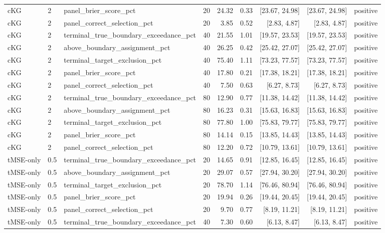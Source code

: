 \begin{longtable}{lllrrrrrl}
cKG & 2 & panel\_brier\_score\_pct & 20 & 24.32 & 0.33 & [23.67, 24.98] & [23.67, 24.98] & positive \\
cKG & 2 & panel\_correct\_selection\_pct & 20 & 3.85 & 0.52 & [2.83, 4.87] & [2.83, 4.87] & positive \\
cKG & 2 & terminal\_true\_boundary\_exceedance\_pct & 40 & 21.55 & 1.01 & [19.57, 23.53] & [19.57, 23.53] & positive \\
cKG & 2 & above\_boundary\_assignment\_pct & 40 & 26.25 & 0.42 & [25.42, 27.07] & [25.42, 27.07] & positive \\
cKG & 2 & terminal\_target\_exclusion\_pct & 40 & 75.40 & 1.11 & [73.23, 77.57] & [73.23, 77.57] & positive \\
cKG & 2 & panel\_brier\_score\_pct & 40 & 17.80 & 0.21 & [17.38, 18.21] & [17.38, 18.21] & positive \\
cKG & 2 & panel\_correct\_selection\_pct & 40 & 7.50 & 0.63 & [6.27, 8.73] & [6.27, 8.73] & positive \\
cKG & 2 & terminal\_true\_boundary\_exceedance\_pct & 80 & 12.90 & 0.77 & [11.38, 14.42] & [11.38, 14.42] & positive \\
cKG & 2 & above\_boundary\_assignment\_pct & 80 & 16.23 & 0.31 & [15.63, 16.83] & [15.63, 16.83] & positive \\
cKG & 2 & terminal\_target\_exclusion\_pct & 80 & 77.80 & 1.00 & [75.83, 79.77] & [75.83, 79.77] & positive \\
cKG & 2 & panel\_brier\_score\_pct & 80 & 14.14 & 0.15 & [13.85, 14.43] & [13.85, 14.43] & positive \\
cKG & 2 & panel\_correct\_selection\_pct & 80 & 12.20 & 0.72 & [10.79, 13.61] & [10.79, 13.61] & positive \\
tMSE-only & 0.5 & terminal\_true\_boundary\_exceedance\_pct & 20 & 14.65 & 0.91 & [12.85, 16.45] & [12.85, 16.45] & positive \\
tMSE-only & 0.5 & above\_boundary\_assignment\_pct & 20 & 29.07 & 0.57 & [27.94, 30.20] & [27.94, 30.20] & positive \\
tMSE-only & 0.5 & terminal\_target\_exclusion\_pct & 20 & 78.70 & 1.14 & [76.46, 80.94] & [76.46, 80.94] & positive \\
tMSE-only & 0.5 & panel\_brier\_score\_pct & 20 & 19.94 & 0.26 & [19.44, 20.45] & [19.44, 20.45] & positive \\
tMSE-only & 0.5 & panel\_correct\_selection\_pct & 20 & 9.70 & 0.77 & [8.19, 11.21] & [8.19, 11.21] & positive \\
tMSE-only & 0.5 & terminal\_true\_boundary\_exceedance\_pct & 40 & 7.30 & 0.60 & [6.13, 8.47] & [6.13, 8.47] & positive \\

\end{longtable}
